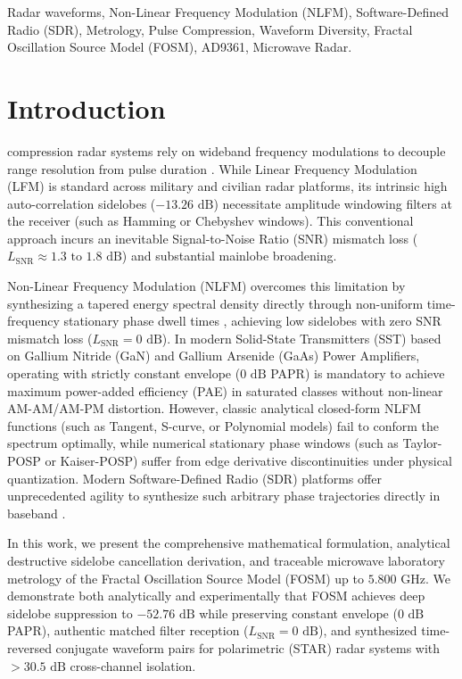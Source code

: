 \documentclass[journal,compsoc]{IEEEtran}
\begin{document}
\begin{IEEEkeywords}
Radar waveforms, Non-Linear Frequency Modulation (NLFM), Software-Defined Radio (SDR), Metrology, Pulse Compression, Waveform Diversity, Fractal Oscillation Source Model (FOSM), AD9361, Microwave Radar.
\end{IEEEkeywords}

\section{Introduction}
 compression radar systems rely on wideband frequency modulations to decouple range resolution from pulse duration \cite{skolnik2008radar, cook1967radar}. While Linear Frequency Modulation (LFM) is standard across military and civilian radar platforms, its intrinsic high auto-correlation sidelobes ($-13.26\text{ dB}$) necessitate amplitude windowing filters at the receiver (such as Hamming or Chebyshev windows). This conventional approach incurs an inevitable Signal-to-Noise Ratio (SNR) mismatch loss ($L_{\text{SNR}} \approx 1.3\text{ to }1.8\text{ dB}$) and substantial mainlobe broadening.

Non-Linear Frequency Modulation (NLFM) overcomes this limitation by synthesizing a tapered energy spectral density directly through non-uniform time-frequency stationary phase dwell times \cite{doerry2006generating}, achieving low sidelobes with zero SNR mismatch loss ($L_{\text{SNR}} = 0\text{ dB}$). In modern Solid-State Transmitters (SST) based on Gallium Nitride (GaN) and Gallium Arsenide (GaAs) Power Amplifiers, operating with strictly constant envelope ($0\text{ dB}$ PAPR) is mandatory to achieve maximum power-added efficiency (PAE) in saturated classes without non-linear AM-AM/AM-PM distortion. However, classic analytical closed-form NLFM functions (such as Tangent, S-curve, or Polynomial models) fail to conform the spectrum optimally, while numerical stationary phase windows (such as Taylor-POSP or Kaiser-POSP) suffer from edge derivative discontinuities under physical quantization. Modern Software-Defined Radio (SDR) platforms offer unprecedented agility to synthesize such arbitrary phase trajectories directly in baseband \cite{varshney2017sdr}.

In this work, we present the comprehensive mathematical formulation, analytical destructive sidelobe cancellation derivation, and traceable microwave laboratory metrology of the Fractal Oscillation Source Model (FOSM) up to $5.800\text{ GHz}$. We demonstrate both analytically and experimentally that FOSM achieves deep sidelobe suppression to $-52.76\text{ dB}$ while preserving constant envelope ($0\text{ dB}$ PAPR), authentic matched filter reception ($L_{\text{SNR}} = 0\text{ dB}$), and synthesized time-reversed conjugate waveform pairs for polarimetric (STAR) radar systems with $>30.5\text{ dB}$ cross-channel isolation.
\end{document}
